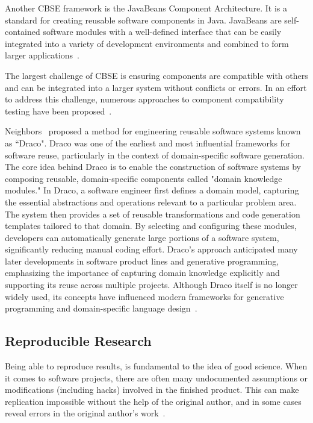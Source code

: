 Another CBSE framework is the JavaBeans Component Architecture. It is a 
standard for creating reusable software components in Java. JavaBeans are 
self-contained software modules with a well-defined interface that can be 
easily integrated into a variety of development environments and combined to 
form larger applications~\cite{OracleJavaBeans}.

The largest challenge of CBSE is ensuring components are compatible with others 
and can be integrated into a larger system without conflicts or errors. In an 
effort to address this challenge, numerous approaches to component 
compatibility testing have been proposed~\cite{Wu2001}.

Neighbors~\cite{Neighbors1980, Neighbors1984,Neighbors1989} proposed a method 
for engineering reusable software systems known as ``Draco". Draco was one of 
the earliest and most influential frameworks for software reuse, particularly 
in the context of domain-specific software generation. The core idea behind 
Draco is to enable the construction of software systems by composing reusable, 
domain-specific components called "domain knowledge modules." In Draco, a 
software engineer first defines a domain model, capturing the essential 
abstractions and operations relevant to a particular problem area. The system 
then provides a set of reusable transformations and code generation templates 
tailored to that domain. By selecting and configuring these modules, developers 
can automatically generate large portions of a software system, significantly 
reducing manual coding effort. Draco's approach anticipated many later 
developments in software product lines and generative programming, emphasizing 
the importance of capturing domain knowledge explicitly and supporting its 
reuse across multiple projects. Although Draco itself is no longer widely used, 
its concepts have influenced modern frameworks for generative programming and 
domain-specific language design~\cite{Neighbors1984, Czarnecki2000}.


\subsection{Reproducible Research}

Being able to reproduce results, is fundamental to the idea of good science.
When it comes to software projects, there are often many undocumented
assumptions or modifications (including hacks) involved in the finished product.
This can make replication impossible without the help of the original author,
and in some cases reveal errors in the original author's
work~\cite{IonescuAndJansson2013}.

